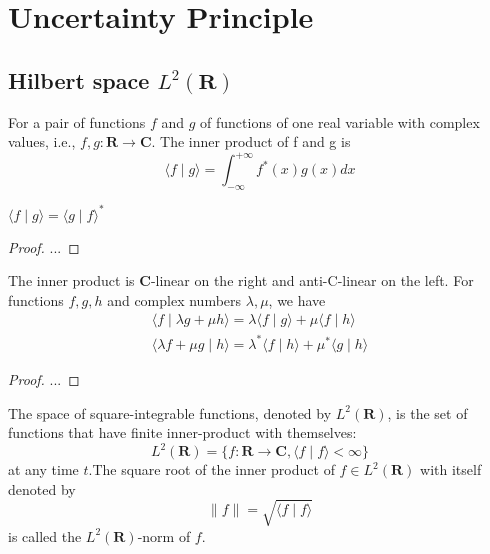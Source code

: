 \section{Uncertainty Principle}

\subsection{Hilbert space $L^2(\mathbf{R})$}

\begin{definition}
    For a pair of functions $f$ and $g$ of functions of one real variable with complex values, i.e., $f, g:\mathbf{R} \longrightarrow \mathbf{C}$. The inner product of f and g is
$$
\langle f \mid g\rangle=\int_{-\infty}^{+\infty} f^{*}(x) g(x) d x
$$
\end{definition}

\begin{property}
    $\langle f \mid g\rangle=\langle g \mid f\rangle^{*}$
\end{property}

\begin{proof}
    ...
\end{proof}

\begin{property}
    The inner product is $\mathbf{C}$-linear on the right and anti-C-linear on the left.
For functions $f, g, h$ and complex numbers $\lambda, \mu$, we have
$$
\begin{gathered}
\langle f \mid \lambda g+\mu h\rangle=\lambda\langle f \mid g\rangle+\mu\langle f \mid h\rangle \\
\langle\lambda f+\mu g \mid h\rangle=\lambda^{*}\langle f \mid h\rangle+\mu^{*}\langle g \mid h\rangle
\end{gathered}
$$
\end{property}

\begin{proof}
    ...
\end{proof}


\begin{definition}
    The space of square-integrable functions, denoted by $L^{2}(\mathbf{R})$, is the set of functions that have finite inner-product with themselves:
    $$
    L^{2}(\mathbf{R})=\{f: \mathbf{R} \longrightarrow \mathbf{C},\langle f \mid f\rangle<\infty\}
    $$
    at any time $t$.The square root of the inner product of $f \in L^{2}(\mathbf{R})$ with itself denoted by 
    $$
    \|f\|=\sqrt{\langle f \mid f\rangle}
    $$
    is called the $L^{2}(\mathbf{R})$-norm of $f$.
\end{definition}

